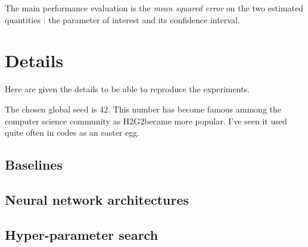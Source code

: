 The main performance evaluation is the \emph{mean squared error} on the two estimated quantities : the parameter of interest and its confidence interval.





\content{}




\section{Details} %
\label{sec:details}

Here are given the details to be able to reproduce the experiments.

The chosen global seed is 42.
This number has become famous ammong the computer science community as H2G2\needcite became more popular.
I've seen it used quite often in codes as an easter egg.




\subsection{Baselines} %
\label{sub:baselines}






\subsection{Neural network architectures} %
\label{sub:neural_network_architectures}








\subsection{Hyper-parameter search} %
\label{sub:hyper_parameter_search}









